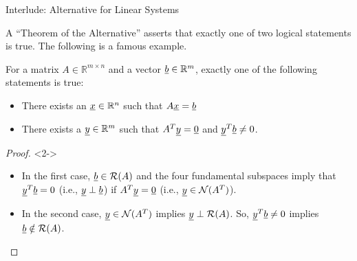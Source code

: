 \documentclass[10pt,english,aspectratio=169]{beamer}
\begin{document}
\begin{frame}{Interlude: Alternative for Linear Systems}

A ``Theorem of the Alternative'' asserts that exactly one of two logical statements is true. The following is a famous example.

\begin{theorem}
For a matrix $A \in \mathbb{R}^{m\times n}$ and a vector $\underline{b}\in \mathbb{R}^m$, exactly one of the following statements is true:
\begin{itemize}
\item There exists an $\underline{x}\in \mathbb{R}^n$ such that $A\underline{x} = \underline{b}$
\item There exists a $\underline{y} \in \mathbb{R}^m$ such that $A^T \underline{y} = \underline{0}$ and $\underline{y}^T \underline{b} \neq 0$.
\end{itemize} 
\end{theorem}

\begin{proof}<2->
\begin{itemize}
\item In the first case, $\underline{b} \in \mathcal{R}(A)$ and the four fundamental subspaces imply that $\underline{y}^T \underline{b} = 0$ (i.e., $\underline{y} \perp \underline{b}$) if $A^T \underline{y} = \underline{0}$ (i.e., $\underline{y}\in \mathcal{N}(A^T)$).
\item In the second case, $\underline{y} \in \mathcal{N}(A^T)$ implies $\underline{y} \perp \mathcal{R}(A)$.
So, $\underline{y}^T \underline{b} \neq 0$ implies $\underline{b} \notin \mathcal{R}(A)$. \qedhere
\end{itemize}
\end{proof}


\end{frame}
\end{document}
